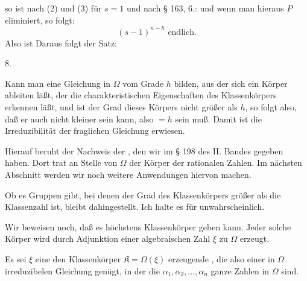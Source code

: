 
so ist nach (2) und (3) für $s=1$
und nach § 163, 6.:
und wenn man hieraus $P$ eliminiert, so folgt:
\[
(s-1)^{n-h} \text{ endlich.}
\]
Also ist
Daraus folgt der Satz:

8. 

Kann man eine Gleichung in $\Omega$ vom Grade $h$ bilden, aus der sich ein Körper ableiten läßt, der die charakteristischen Eigenschaften des Klassenkörpers erkennen läßt, und ist der Grad dieses Körpers nicht größer als $h$, so folgt also, daß er auch nicht kleiner sein kann, also $= h$ sein muß. Damit ist die Irreduzibilität der fraglichen Gleichung erwiesen.

Hierauf beruht der Nachweis der , den wir im § 198 des II. Bandes gegeben haben. Dort trat an Stelle von $\Omega$ der Körper der rationalen Zahlen. Im nächsten Abschnitt werden wir noch weitere Anwendungen hiervon machen.

Ob es Gruppen gibt, bei denen der Grad des Klassenkörpers größer als die Klassenzahl ist, bleibt dahingestellt. Ich halte es für unwahrscheinlich.

Wir beweisen noch, daß es höchstens  Klassenkörper geben kann. Jeder solche Körper wird durch Adjunktion einer algebraischen Zahl $\xi$ zu $\Omega$ erzeugt.

Es sei $\xi$ eine den Klassenkörper $\mathfrak{K} = \Omega(\xi)$ erzeugende , die also einer in $\Omega$ irreduzibelen Gleichung
genügt, in der die $\alpha_1, \alpha_2, \ldots, \alpha_n$ ganze Zahlen in $\Omega$ sind.

